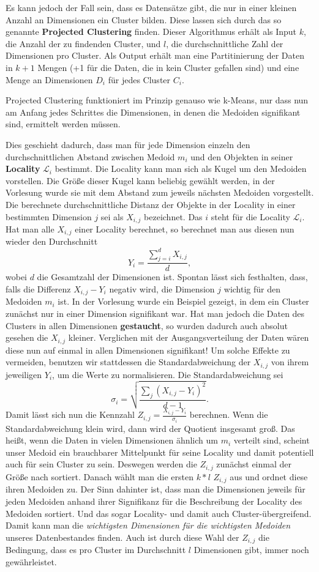 Es kann jedoch der Fall sein, dass es Datensätze gibt, die nur in einer kleinen
Anzahl an Dimensionen ein Cluster bilden. Diese lassen sich durch das so
genannte \textbf{Projected Clustering} finden. Dieser Algorithmus erhält
als Input \(k\), die Anzahl der zu findenden Cluster, und \(l\), die
durchschnittliche Zahl der Dimensionen pro Cluster. Als Output erhält man
eine Partitinierung der Daten in \(k+1\) Mengen (+1 für die Daten, die in
kein Cluster gefallen sind) und eine Menge an Dimensionen \(D_i\) für jedes
Cluster \(C_i\).

Projected Clustering funktioniert im Prinzip genauso wie k-Means, nur dass
nun am Anfang jedes Schrittes die Dimensionen, in denen die Medoiden 
signifikant sind, ermittelt werden müssen. 

Dies geschieht dadurch, dass man
für jede Dimension einzeln den durchschnittlichen Abstand zwischen Medoid
\(m_i\) und den Objekten in seiner \textbf{Locality} \(\mathcal{L}_i\)
bestimmt. Die Locality kann man sich als Kugel um den Medoiden vorstellen.
Die Größe dieser Kugel kann beliebig gewählt werden, in der Vorlesung wurde
sie mit dem Abstand zum jeweils nächsten Medoiden vorgestellt. Die berechnete
durchschnittliche Distanz der Objekte in der Locality
 in einer bestimmten Dimension \(j\) sei als \(X_{i,j}\) bezeichnet.
Das \(i\) steht für die Locality \(\mathcal{L}_i\). Hat man alle \(X_{i,j}\)
einer Locality berechnet, so berechnet man aus diesen nun wieder den 
Durchschnitt \[Y_i = \frac{\sum_{j=i}^d X_{i,j}}{d},\] wobei \(d\) die
Gesamtzahl der Dimensionen ist. Spontan lässt sich festhalten, dass, falls 
die Differenz
\(X_{i,j}-Y_i\) negativ wird, die Dimension \(j\) wichtig für den Medoiden
\(m_i\) ist. In der Vorlesung wurde ein Beispiel gezeigt, in dem ein Cluster
zunächst nur in einer Dimension signifikant war. Hat man jedoch die Daten
des Clusters in allen Dimensionen \textbf{gestaucht}, so wurden dadurch 
auch absolut 
gesehen die \(X_{i,j}\) kleiner. Verglichen mit der Ausgangsverteilung der
Daten wären diese nun auf einmal in allen Dimensionen signifikant! Um solche
Effekte zu vermeiden, benutzen wir stattdessen die Standardabweichung der
\(X_{i,j}\) von ihrem jeweiligen \(Y_i\), um die Werte zu normalisieren.
Die Standardabweichung sei 
\[\sigma_i =\sqrt{\frac{\sum_j (X_{i,j} - Y_i)^2}{d-1}}.\]
Damit lässt sich nun die Kennzahl \(Z_{i,j} = \frac{X_{i,j}-Y_i}{\sigma_i}\) 
berechnen. Wenn die Standardabweichung klein wird, dann wird der Quotient 
insgesamt groß. Das heißt, wenn die Daten in vielen Dimensionen ähnlich um
\(m_i\) verteilt sind, scheint unser Medoid ein brauchbarer Mittelpunkt für
seine Locality und damit potentiell auch für sein Cluster zu sein. Deswegen 
werden die \(Z_{i,j}\) zunächst einmal der Größe nach sortiert. Danach wählt
man die ersten \(k*l\) \(Z_{i,j}\) aus und ordnet diese ihren Medoiden zu.
Der Sinn dahinter ist, dass man die Dimensionen jeweils für jeden Medoiden 
anhand ihrer Signifikanz für die Beschreibung der Locality des Medoiden sortiert.
Und das sogar Locality- und damit auch Cluster-übergreifend. Damit kann man 
die \textit{wichtigsten Dimensionen für die wichtigsten Medoiden} unseres
Datenbestandes finden. Auch ist durch diese Wahl der \(Z_{i,j}\) die 
Bedingung, dass es pro Cluster im Durchschnitt \(l\) Dimensionen gibt,
immer noch gewährleistet.

